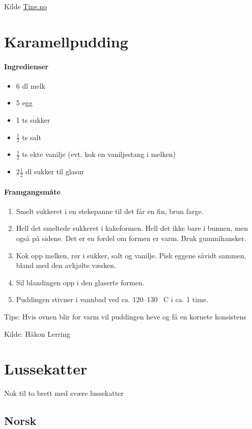 \documentclass[12pt,a4paper]{book}
\begin{document}
{Kilde \href{http://www.tine.no/oppskrifter/kaker/vafler-og-smakaker/8721.cms?hvite-kakemenn-(og--damer)}{Tine.no}
\clearpage{}
\clearpage{}\section{Karamellpudding}

\paragraph{Ingredienser}
\begin{itemize}[noitemsep]
	\item 6 dl melk
	\item 5 egg
	\item 1 ts sukker
	\item $\frac{1}{2}$ ts salt
	\item $\frac{1}{2}$ ts ekte vanilje (evt. kok en vaniljestang i melken)
	\item $2 \frac{1}{2}$ dl sukker til glasur
\end{itemize}

\paragraph{Framgangsmåte}
\begin{enumerate}
	\item Smelt sukkeret i en stekepanne til det får en fin, brun farge. \item Hell det smeltede sukkeret i kakeformen. Hell det ikke bare i bunnen, men også på sidene. Det er en fordel om formen er varm. Bruk gummihansker.
	\item Kok opp melken, rør i sukker, salt og vanilje. Pisk eggene såvidt sammen, bland med den avkjølte væsken.
	\item Sil blandingen opp i den glaserte formen.
	\item Puddingen stivner i vannbad ved ca. 120--130 \degree~C i ca. 1 time.

\end{enumerate}


Tips: Hvis ovnen blir for varm vil puddingen heve og få en kornete konsistens


Kilde: Håkon Lerring
\clearpage{}
\clearpage{}\section{﻿Lussekatter}
Nok til to brett med svære lussekatter
\subsection{Norsk}

}
\end{document}
